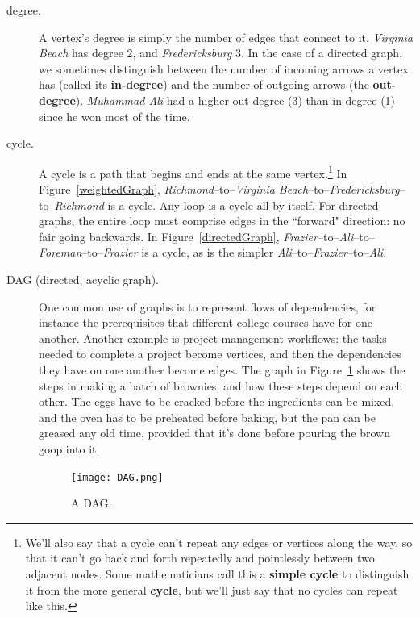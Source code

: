 \begin{description}
\item[degree.] A vertex's degree is simply the number of edges that connect
to it. \textsl{Virginia Beach} has degree 2, and \textsl{Fredericksburg} 3.
In the case of a directed graph, we sometimes distinguish between the
number of incoming arrows a vertex has (called its \textbf{in-degree}) and
the number of outgoing arrows (the \textbf{out-degree}). \textsl{Muhammad
Ali} had a higher out-degree (3) than in-degree (1) since he won most of
the time.

\item[cycle.] A cycle is a path that begins and ends at the same
vertex.\footnote{We'll also say that a cycle can't repeat any edges or
vertices along the way, so that it can't go back and forth repeatedly and
pointlessly between two adjacent nodes. Some mathematicians call this a
\textbf{simple cycle} to distinguish it from the more general
\textbf{cycle}, but we'll just say that no cycles can repeat like this.} In
Figure~\ref{weightedGraph}, \textsl{Richmond}--to--\textsl{Virginia
Beach}--to--\textsl{Fredericksburg}--to--\textsl{Richmond} is a cycle.  Any
loop is a cycle all by itself. For directed graphs, the entire loop must
comprise edges in the ``forward" direction: no fair going backwards. In
Figure~\ref{directedGraph},
\textsl{Frazier}--to--\textsl{Ali}--to--\textsl{Foreman}--to--\textsl{Frazier}
is a cycle, as is the simpler
\textsl{Ali}--to--\textsl{Frazier}--to--\textsl{Ali}.

\item[DAG (directed, acyclic graph).] One common use of graphs is to
represent flows of dependencies, for instance the prerequisites that
different college courses have for one another. Another example is project
management workflows: the tasks needed to complete a project become
vertices, and then the dependencies they have on one another become edges.
The graph in Figure~\ref{DAG} shows the steps in making a batch of
brownies, and how these steps depend on each other. The eggs have to be
cracked before the ingredients can be mixed, and the oven has to be
preheated before baking, but the pan can be greased any old time, provided
that it's done before pouring the brown goop into it.

\begin{figure}[ht]
\centering
\texttt{[image: DAG.png]}
\caption{A DAG.}
\label{DAG}
\end{figure}


\end{description}
